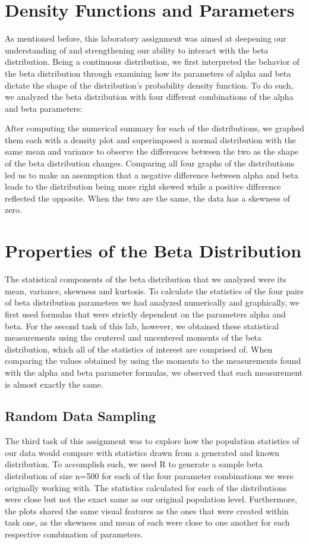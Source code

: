 \documentclass{article}\usepackage[]{graphicx}\usepackage[]{xcolor}
\begin{document}
\begin{multicols}{2}
\section{Density Functions and Parameters}
As mentioned before, this laboratory assignment was aimed at deepening our understanding of and strengthening our ability to interact with the beta distribution. Being a continuous distribution, we first interpreted the behavior of the beta distribution through examining how its parameters of alpha and beta dictate the shape of the distribution's probability density function. To do such, we analyzed the beta distribution with four different combinations of the alpha and beta parameters:

After computing the numerical summary for each of the distributions, we graphed them each with a density plot and superimposed a normal distribution with the same mean and variance to observe the differences between the two as the shape of the beta distribution changes. Comparing all four graphs of the distributions led us to make an assumption that a negative difference between alpha and beta leads to the distribution being more right skewed while a positive difference reflected the opposite. When the two are the same, the data has a skewness of zero.



\section{Properties of the Beta Distribution}
The statistical components of the beta distribution that we analyzed were its mean, variance, skewness and kurtosis. To calculate the statistics of the four pairs of beta distribution parameters we had analyzed numerically and graphically, we first used formulas that were strictly dependent on the parameters alpha and beta. For the second task of this lab, however, we obtained these statistical measurements using the centered and uncentered moments of the beta distribution, which all of the statistics of interest are comprised of.  When comparing the values obtained by using the moments to the measurements found with the alpha and beta parameter formulas, we observed that each measurement is almost exactly the same. 



\subsection{Random Data Sampling}
The third task of this assignment was to explore how the population statistics of our data would compare with statistics drawn from a generated and known distribution. To accomplish such, we used R to generate a sample beta distribution of size n=500 for each of the four parameter combinations we were originally working with. The statistics calculated for each of the distributions were close but not the exact same as our original population level. Furthermore, the plots shared the same visual features as the ones that were created within task one, as the skewness and mean of each were close to one another for each respective combination of parameters.


\end{multicols}
\end{document}
